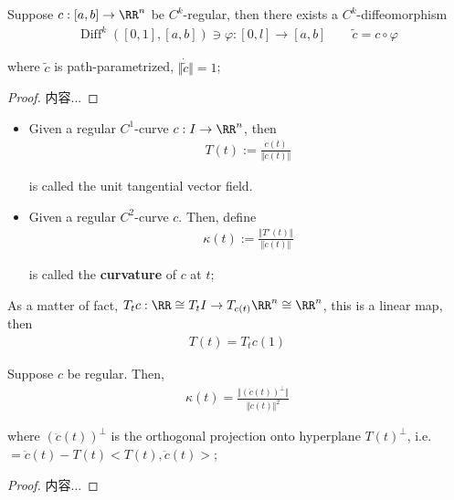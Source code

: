 \documentclass[Total.tex]{subfiles}
\begin{document}
			\begin{proposition}
				Suppose $c:[a,b]\rightarrow \RR^n$ be $C^k$-regular, then there exists a $C^k$-diffeomorphism
				\begin{gather*}
					\operatorname{Diff}^k([0,1],[a,b])\ni \varphi:[0,l]\rightarrow [a,b]\qquad \tilde{c}=c\circ \varphi
				\end{gather*}
				
				where $\tilde{c}$ is path-parametrized, $\Vert \dot{\tilde{c}}\Vert=1$;
			\end{proposition}
			\begin{proof}
				内容...
			\end{proof}
			
			\begin{Def}
				\begin{itemize}
					\item Given a regular $C^1$-curve $c:I\rightarrow \RR^n$, then
					\begin{gather*}
						T(t):=\frac{\dot{c}(t)}{\Vert \dot{c}(t)\Vert}
					\end{gather*}
					
					is called the unit tangential vector field. 
					\item Given a regular $C^2$-curve $c$. Then, define
					\begin{gather*}
						\kappa(t):=\frac{\Vert T'(t)\Vert}{\Vert \dot{c}(t)\Vert}
					\end{gather*}
					
					is called the \textbf{curvature} of $c$ at $t$;
				\end{itemize}
			\end{Def}
			
			As a matter of fact, $T_t c:\RR\cong T_t I\rightarrow T_{c(t)} \RR^n\cong \RR^n$, this is a linear map, then
			\begin{gather*}
				T(t)=T_tc(1)
			\end{gather*}
			
			\begin{proposition}
				Suppose $c$ be regular. Then,
				\begin{gather*}
					\kappa(t)=\frac{\Vert (\ddot{c}(t))^\perp \Vert}{\Vert \dot{c}(t)\Vert^2}
				\end{gather*}
				
				where $ (\ddot{c}(t))^\perp$ is the orthogonal projection onto hyperplane $T(t)^\perp$, i.e. $=\ddot{c}(t)-T(t)<T(t),\ddot{c}(t)>$;
			\end{proposition}
			\begin{proof}
				内容...
			\end{proof}
			
\end{document}
